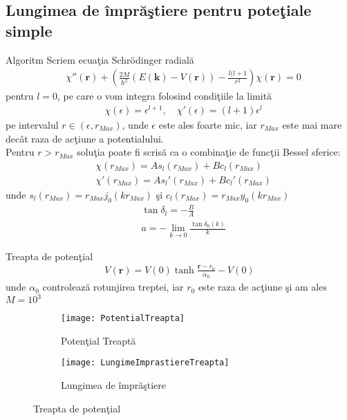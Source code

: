 \subsection{Lungimea de \^{i}mpr\u{a}\c{s}tiere pentru pote\c{t}iale simple}
\begin{frame}[allowframebreaks]{Algoritm}
Scriem ecua\c{t}ia Schr\"{o}dinger radial\u{a} 
\begin{align}
&\chi''({\bm r})+(\frac{2M}{\hbar^2}(E({\bm k})-V({\bm r}))-\frac{l(l+1}{r^2})\chi({\bm r})=0 \label{srad}
\end{align}
pentru $l=0$, pe care o vom integra folosind condi\c tiile la limit\u a
\begin{align}
 &\chi(\epsilon)=\epsilon^{l+1},\quad \chi'(\epsilon)=(l+1)\epsilon^l
\end{align}
pe intervalul $r\in (\epsilon,r_{Max})$, unde $\epsilon$ este ales foarte mic, iar $r_{Max}$ este mai mare dec\^at raza de ac\c tiune a potentialului.\\ 
Pentru $r>r_{Max}$ solu\c tia poate fi scris\u a ca o combina\c tie de func\c tii Bessel sferice:
 \begin{align}
&\chi(r_{Max})=A s_l(r_{Max}) +B c_l(r_{Max})\label{eq1}\\
&\chi'(r_{Max})=A s_l'(r_{Max}) +B c_l'(r_{Max})\label{eq2}
\end{align}
unde $s_l(r_{Max})=r_{Max}j_0(k r_{Max})$ \c{s}i $c_l(r_{Max})=r_{Max} y_0 (k r_{Max})$
\begin{align}
&\tan \delta_l=-\frac{B}{A}\\
&a=-\lim_{k\to 0}\frac{\tan\delta_0(k)}{k}
\end{align}
\end{frame}

\begin{frame}[allowframebreaks]{Treapta de poten\c{t}ial}
\begin{align}
V({\bm r})=V(0)\tanh{\frac{{\bm r}-r_0}{\alpha_0}}-V(0)
\end{align}
unde $\alpha_0$ controleaz\u{a} rotunjirea treptei, iar $r_0$ este raza de ac\c{t}iune \c{s}i am ales $M =10^3$ 

\begin{figure}[h!]
\centering
\begin{subfigure}{.5\textwidth}
  \centering
  \texttt{[image: PotentialTreapta]}
  \caption{Poten\c{t}ial Treapt\u{a}}
  \label{fig:sub311}
\end{subfigure}%
\begin{subfigure}{.5\textwidth}
  \centering
  \texttt{[image: LungimeImprastiereTreapta]}
  \caption{Lungimea de \^{i}mpr\u{a}\c{s}tiere}
  \label{fig:sub312}
\end{subfigure}
\caption{Treapta de poten\c{t}ial}
\label{fig:treapta}
\end{figure}

\end{frame}

